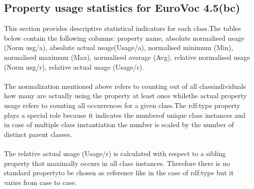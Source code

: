 \documentclass[10pt,a4paper,titlepage,final]{article}
\begin{document}
\subsection{Property usage statistics for EuroVoc 4.5(bc)}
This section provides descriptive statistical indicators for each class.The tables below contain the following columns: property name, absolute normalised usage (Norm usg/a), absolute actual usage(Usage/a), normalised minimum (Min), normalised maximum (Max), normalised average (Avg), relative normalised usage (Norm usg/r), relative actual usage (Usage/r).\\\\The normalization mentioned above refers to counting out of all classindividuals how many are actually using the property at least once whilethe actual property usage refers to counting all occurrences for a given class.The rdf:type property plays a special role because it indicates the numberof unique class instances and in case of multiple class instantiation the number is scaled by the  number of distinct parent classes. \\\\The relative actual usage (Usage/r) is calculated with respect to a sibling property that maximally occurs in all class instances. Therefore there is no standard propertyto be chosen as reference like in the case of rdf:type but it varies from case to case.
\end{document}
